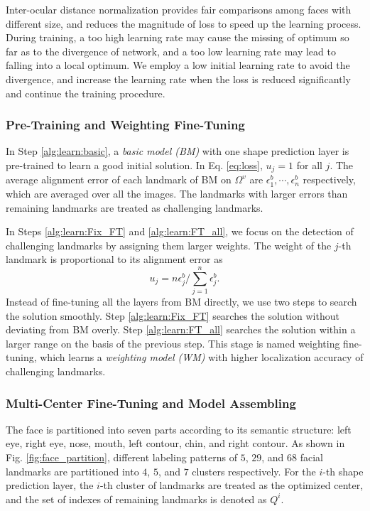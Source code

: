 \documentclass[journal]{IEEEtran}
\begin{document}
Inter-ocular distance normalization provides fair comparisons among faces with different size, and reduces the magnitude of loss to speed up the learning process. During training, a too high learning rate may cause the missing of optimum so far as to the divergence of network, and a too low learning rate may lead to falling into a local optimum. We employ a low initial learning rate to avoid the divergence, and increase the learning rate when the loss is reduced significantly and continue the training procedure.

\subsubsection{Pre-Training and Weighting Fine-Tuning}

In Step \ref{alg:learn:basic}, a \emph{basic model (BM)} with one shape prediction layer is pre-trained to learn a good initial solution. In Eq. \ref{eq:loss}, $u_j=1$ for all $j$. The average alignment error of each landmark of BM on $\Omega^v$ are $\epsilon^b_1, \cdots, \epsilon^b_n$ respectively, which are averaged over all the images. The landmarks with larger errors than remaining landmarks are treated as challenging landmarks.

In Steps \ref{alg:learn:Fix_FT} and \ref{alg:learn:FT_all}, we focus on the detection of challenging landmarks by assigning them larger weights. The weight of the $j$-th landmark is proportional to its alignment error as
\begin{equation}
\label{eq:wm_weight}
u_j=n\epsilon^b_j/\sum_{j=1}^n \epsilon^b_j.
\end{equation}
Instead of fine-tuning all the layers from BM directly, we use two steps to search the solution smoothly. Step \ref{alg:learn:Fix_FT} searches the solution without deviating from BM overly. Step \ref{alg:learn:FT_all} searches the solution within a larger range on the basis of the previous step. This stage is named weighting fine-tuning, which learns a \emph{weighting model (WM)} with higher localization accuracy of challenging landmarks.

\subsubsection{Multi-Center Fine-Tuning and Model Assembling}

The face is partitioned into seven parts according to its semantic structure: left eye, right eye, nose, mouth, left contour, chin, and right contour. As shown in Fig. \ref{fig:face_partition}, different labeling patterns of $5$, $29$, and $68$ facial landmarks are partitioned into $4$, $5$, and $7$ clusters respectively. For the $i$-th shape prediction layer, the $i$-th cluster of landmarks are treated as the optimized center, and the set of indexes of remaining landmarks is denoted as $Q^{i}$.
\end{document}
